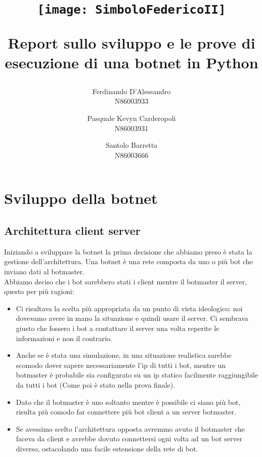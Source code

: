\documentclass[a4paper]{report}
\begin{document}
\author {Ferdinando D'Alessandro\\N86003933\and Pasquale Kevyn Carderopoli \\ N86003931\and Santolo Barretta\\N86003666}
\title {
	\begin{figure}[hp]
		\centerline{\texttt{[image: SimboloFedericoII]}}
	\end{figure} Report sullo sviluppo e le prove di esecuzione di una botnet in Python }


\date{}
\maketitle

\tableofcontents

\chapter{Sviluppo della botnet}

\section{Architettura client server}

Iniziando a sviluppare la botnet la prima decisione che abbiamo preso è stata la gestione dell'architettura.
Una botnet è una rete composta da uno o più bot che inviano dati al botmaster.\\
Abbiamo deciso che i bot sarebbero stati i client mentre il botmaster il server, questo per più ragioni:
\begin{itemize}
	\item Ci risultava la scelta più appropriata da un punto di vista ideologico: noi dovevamo avere in mano la situazione e quindi usare il server. Ci sembrava giusto che fossero i bot a contattare il server una volta reperite le informazioni e non il contrario.
	\item Anche se è stata una simulazione, in una situazione realistica sarebbe scomodo dover sapere necessariamente l'ip di tutti i bot, mentre un botmaster è probabile sia configurato su un ip statico facilmente raggiungibile da tutti i bot (Come poi è stato nella prova finale).
	\item Dato che il botmaster è uno soltanto mentre è possibile ci siano più bot, risulta più comodo far connettere più bot client a un server botmaster.
	\item Se avessimo scelto l'architettura opposta avremmo avuto il botmaster che faceva da client e avrebbe dovuto connettersi ogni volta ad un bot server diverso, ostacolando una facile estensione della rete di bot.
\end{itemize}
\end{document}

